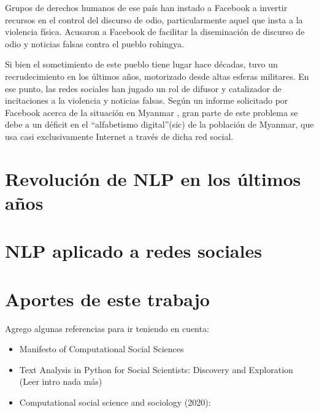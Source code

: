 Grupos de derechos humanos de ese país han instado a Facebook a invertir recursos en el control del discurso de odio, particularmente aquel que insta a la violencia física\cite{irrawaddy2018zuckerberg}. Acusaron a Facebook de facilitar la diseminación de discurso de odio y noticias falsas contra el pueblo rohingya.

Si bien el sometimiento de este pueblo tiene lugar hace décadas, tuvo un recrudecimiento en los últimos años, motorizado desde altas esferas militares. En ese punto, las redes sociales han jugado un rol de difusor y catalizador de incitaciones a la violencia y noticias falsas. Según un informe solicitado por Facebook acerca de la situación en Myanmar \cite{warofka2018independent}, gran parte de este problema se debe a un déficit en el ``alfabetismo digital''(sic) de la población de Myanmar, que usa casi exclusivamente Internet a través de dicha red social.















\section{Revolución de NLP en los últimos años}
\section{NLP aplicado a redes sociales}

\section{Aportes de este trabajo}

Agrego algunas referencias para ir teniendo en cuenta:

\begin{itemize}
    \item Manifesto of Computational Social Sciences \cite{conte2012manifesto}
    \item Text Analysis in Python for Social Scientists: Discovery and Exploration \cite{hovy2020text} (Leer intro nada más)
    \item Computational social science and sociology (2020): \cite{edelmann2020computational}
\end{itemize}